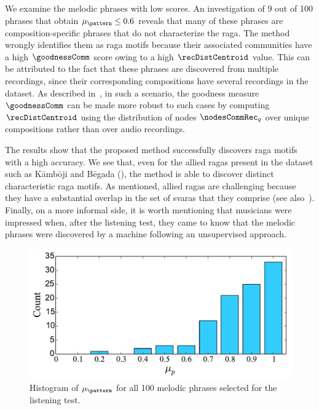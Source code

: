 {We examine the melodic phrases with low scores. An investigation of 9 out of 100 phrases that obtain $\mu_\pattern\leq0.6$ reveals that many of these phrases are composition-specific phrases that do not characterize the \gls{raga}. The method wrongly identifies them as \gls{raga} motifs because their associated communities have a high $\goodnessComm$ score owing to a high $\recDistCentroid$ value. This can be attributed to the fact that these phrases are discovered from multiple recordings, since their corresponding compositions have several recordings in the dataset.  As described in~, in such a scenario, the goodness measure $\goodnessComm$ can be made more robust to such cases by computing $\recDistCentroid$ using the distribution of nodes ${{\nodesCommRec}_q}$ over unique compositions rather than over audio recordings.

The results show that the proposed method successfully discovers \gls{raga} motifs with a high accuracy. We see that, even for the allied \glspl{raga} present in the dataset such as K\={a}mb\={o}ji and B\={e}gada (), the method is able to discover distinct characteristic \gls{raga} motifs. As mentioned, allied \glspl{raga} are challenging because they have a substantial overlap in the set of svaras that they comprise (see also~). Finally, on a more informal side, it is worth mentioning that musicians were impressed when, after the listening test, they came to know that the melodic phrases were discovered by a machine following an unsupervised approach. 


\begin{figure}
	\begin{center}
		\includegraphics[width=\figSizeSixty]{ch06_patterns/figures/Characterization/histogram_musician_rating.pdf}
	\end{center}
	\caption[Histogram of mean musician ratings for 100 melodic phrases]{Histogram of $\mu_\pattern$ for all 100 melodic phrases selected for the listening test.}
	\label{fig:average_rating_histogram_pattern_characterization}
\end{figure}


}
